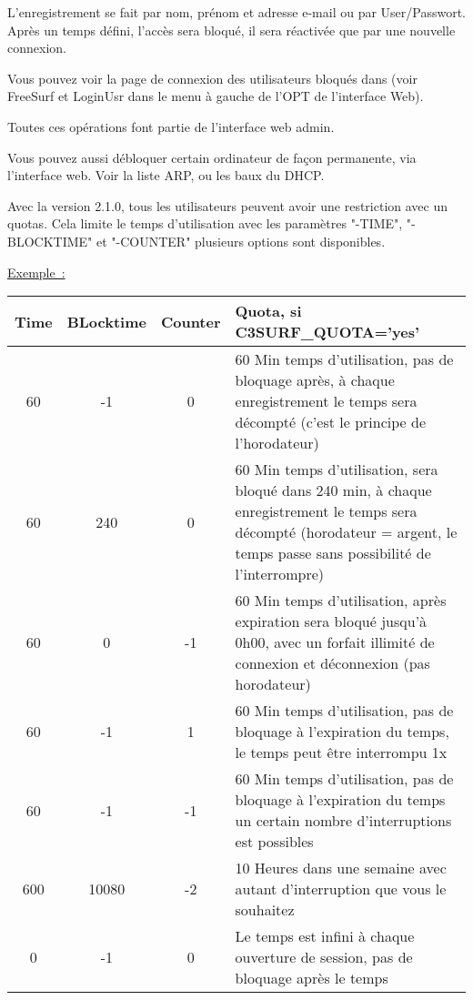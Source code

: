 L'enregistrement se fait par nom, prénom et adresse e-mail ou par User/Passwort.
Après un temps défini, l'accès sera bloqué, il sera réactivée que par une nouvelle
connexion.
\parskip 12pt

Vous pouvez voir la page de connexion des utilisateurs bloqués dans 
(voir FreeSurf et LoginUsr dans le menu à gauche de l'OPT de l'interface Web).
\parskip 12pt

Toutes ces opérations font partie de l'interface web admin.
\parskip 12pt

Vous pouvez aussi débloquer certain ordinateur de façon permanente,
via l'interface web. Voir la liste ARP, ou les baux du DHCP.

\parskip 12pt

Avec la version 2.1.0, tous les utilisateurs peuvent avoir une restriction avec
un quotas. Cela limite le temps d'utilisation avec les paramètres
"-TIME", "-BLOCKTIME" et "-COUNTER" plusieurs options sont disponibles.

\underline{Exemple~:}\\

\begin{tabular}{|c|c|c|p{12cm}|}
 \hline
   Time & BLocktime & Counter & Quota, si C3SURF\_QUOTA='yes' \\
 \hline
 \hline
   60 & -1 & 0 & 60 Min temps d'utilisation, pas de bloquage après, à chaque enregistrement
   le temps sera décompté (c'est le principe de l'horodateur) \\
 \hline 
   60 & 240 & 0 & 60 Min temps d'utilisation, sera bloqué dans 240 min, à chaque enregistrement
   le temps sera décompté (horodateur = argent, le temps passe sans possibilité de l'interrompre) \\
 \hline
   60 & 0 & -1 & 60 Min temps d'utilisation, après expiration sera bloqué jusqu'à 0h00, avec
   un forfait illimité de connexion et déconnexion (pas horodateur) \\
 \hline
   60 & -1 & 1 & 60 Min temps d'utilisation, pas de bloquage à l'expiration du temps,
   le temps peut être interrompu 1x \\
 \hline
   60 & -1 & -1 & 60 Min temps d'utilisation, pas de bloquage à l'expiration du temps
   un certain nombre d'interruptions est possibles \\
 \hline
   600 & 10080 & -2 & 10 Heures dans une semaine avec autant d'interruption que vous le souhaitez \\
 \hline
   0 & -1 & 0 & Le temps est infini à chaque ouverture de session, pas de bloquage après le temps \\
 \hline
\end{tabular}

